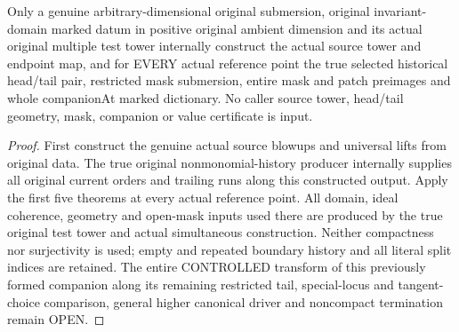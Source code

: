 \begin{theorem}
\label{hir:submersion-historical-masks-original-only}
\leanok
Only a genuine arbitrary-dimensional original submersion, original
invariant-domain marked datum in positive original ambient dimension and
its actual original multiple test tower internally construct the actual
source tower and endpoint map, and for EVERY actual reference point the
true selected historical head/tail pair, restricted mask submersion,
entire mask and patch preimages and whole companionAt marked dictionary.
No caller source tower, head/tail geometry, mask, companion or value
certificate is input.
\end{theorem}
\begin{proof}
First construct the genuine actual source blowups and universal lifts from
original data. The true original nonmonomial-history producer internally
supplies all original current orders and trailing runs along this constructed
output. Apply the first five theorems at every actual reference point. All
domain, ideal coherence, geometry and open-mask inputs used there are
produced by the true original test tower and actual simultaneous construction.
Neither compactness nor surjectivity is used; empty and repeated boundary
history and all literal split indices are retained. The entire CONTROLLED
transform of this previously formed companion along its remaining
restricted tail, special-locus and tangent-choice comparison, general
higher canonical driver and noncompact termination remain OPEN.
\end{proof}

